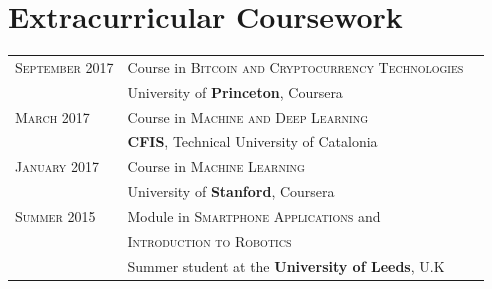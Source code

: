 \documentclass[a4paper,10pt]{article} %
\begin{document}
\section{Extracurricular Coursework}
\begin{tabular}{R{3cm}L{9cm}C{3cm}}	
\textsc{September} 2017 &  Course in \small{\textsc{Bitcoin and Cryptocurrency Technologies}} & \hspace{15pt} \\[3pt]
 & University of \textbf{Princeton}, Coursera\\[7pt]
 
\textsc{March} 2017 &  Course in \textsc{Machine and Deep Learning} & \hspace{15pt} \\[3pt] & \textbf{CFIS}, Technical University of Catalonia   \\[7pt]

\textsc{January} 2017 &  Course in \textsc{Machine Learning}  & \hspace{15pt} \\
& University of \textbf{Stanford}, Coursera \\[7pt]

\textsc{Summer} 2015 & Module in \textsc{Smartphone Applications} and & \hspace{15pt} \\
& \textsc{Introduction to Robotics} \\
 & Summer student at the \textbf{University of Leeds}, U.K\\[3pt]
\end{tabular}
\end{document}
